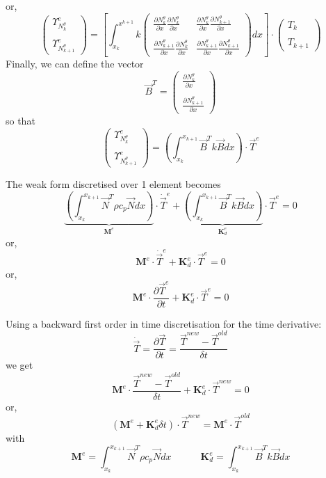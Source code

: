 or,
\[
\left(
\begin{array}{cc}
 {\Upsilon}_{N_k^\theta}^e \\ \\ {\Upsilon}_{N_{k+1}^\theta}^e
\end{array}
\right)
=
\left[
\int_{x_k}^{x^{k+1}}
k
\left(
\begin{array}{cc}
\frac{\partial N_k^\theta}{\partial x}  \frac{\partial  N_{k}^\theta } {\partial x}   & 
\frac{\partial N_k^\theta}{\partial x}  \frac{\partial  N_{k+1}^\theta } {\partial x}  
\\ \\
\frac{\partial N_{k+1}^\theta}{\partial x}  \frac{\partial  N_{k}^\theta } {\partial x}   & 
\frac{\partial N_{k+1}^\theta}{\partial x}  \frac{\partial  N_{k+1}^\theta } {\partial x}  
\end{array}
\right)
dx
\right]
\cdot
\left(
\begin{array}{c}
T_k \\ \\ T_{k+1}
\end{array}
\right)
\]
Finally, we can define the vector 
\[
{\vec B}^T=
\left(
\begin{array}{cc}
 \frac{\partial N_k^\theta}{\partial x}   \\ \\
 \frac{\partial N_{k+1}^\theta}{\partial x}
\end{array}
\right)
\]
so that 
\[
\left(
\begin{array}{cc}
 {\Upsilon}_{N_k^\theta}^e \\ \\ {\Upsilon}_{N_{k+1}^\theta}^e
\end{array}
\right)
=
\left( \int_{x_k}^{x_{k+1}}   {\vec B}^T k {\vec B} dx  \right) \cdot {\vec T}^e
\]

The weak form discretised over 1 element becomes
\[
\underbrace{\left( \int_{x_k}^{x_{k+1}}   {\vec N}^T \rho c_p {\vec N} dx  \right) }_{\bm M^e} \cdot \dot{\vec T}^e
+
\underbrace{\left( \int_{x_k}^{x_{k+1}}   {\vec B}^T k {\vec B} dx  \right)}_{{\bm K}_d^e} \cdot {\vec T}^e
=0
\]
or,
\[
\boxed{
{\bm M}^e \cdot \dot{\vec T}^e + {\bm K}_d^e \cdot {\vec T}^e = 0
}
\]
or,
\[
\boxed{
{\bm M}^e \cdot \frac{\partial {\vec T}^e}{\partial t} + {\bm K}_d^e \cdot {\vec T}^e = 0
}
\]

Using a backward first order in time discretisation for the time derivative:
\[
\dot{\vec T}= \frac{\partial {\vec T}}{\partial t} = \frac{{\vec T}^{new}-{\vec T}^{old}}{\delta t}
\]
we get
\[
{\bm M}^e \cdot \frac{{\vec T}^{new}-{\vec T}^{old}}{\delta t} + {\bm K}_d^e \cdot {\vec T}^{new} = 0
\]
or, 
\[
\boxed{
( {\bm M}^e +  {\bm K}_d^e  \delta t ) \cdot {\vec T}^{new} =  {\bm M}^e \cdot  {\vec T}^{old}
}
\]
with 
\[
{\bm M}^e=  \int_{x_k}^{x_{k+1}}   {\vec N}^T \rho c_p {\vec N} dx  
\quad\quad\quad
{\bm K}_d^e =
 \int_{x_k}^{x_{k+1}}   {\vec B}^T k {\vec B} dx 
\]

